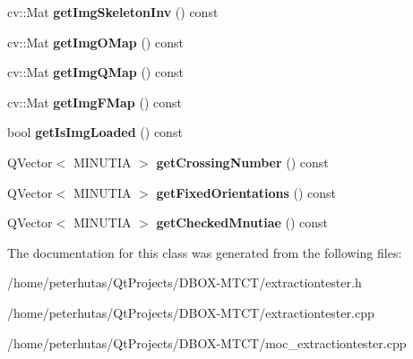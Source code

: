 \begin{DoxyCompactItemize}
\item 
\mbox{\label{class_extraction_tester_af64be134cee0ea0f58ce88e625156b23}} 
cv\+::\+Mat {\bfseries get\+Img\+Skeleton\+Inv} () const
\item 
\mbox{\label{class_extraction_tester_ab55ec8a210398568ff0f3cbe68d861ce}} 
cv\+::\+Mat {\bfseries get\+Img\+O\+Map} () const
\item 
\mbox{\label{class_extraction_tester_a1df8b0906aba9fa37c91bef924efa0f1}} 
cv\+::\+Mat {\bfseries get\+Img\+Q\+Map} () const
\item 
\mbox{\label{class_extraction_tester_a246569d4b1cc50c3b7f0557196674e65}} 
cv\+::\+Mat {\bfseries get\+Img\+F\+Map} () const
\item 
\mbox{\label{class_extraction_tester_a10ca92bb573fdeb262e75393806301fc}} 
bool {\bfseries get\+Is\+Img\+Loaded} () const
\item 
\mbox{\label{class_extraction_tester_aa250b93d32c1cd6eb6ff277b78bb4fd6}} 
Q\+Vector$<$ M\+I\+N\+U\+T\+IA $>$ {\bfseries get\+Crossing\+Number} () const
\item 
\mbox{\label{class_extraction_tester_a78add98013d8dc6bcd4e0564d63ae185}} 
Q\+Vector$<$ M\+I\+N\+U\+T\+IA $>$ {\bfseries get\+Fixed\+Orientations} () const
\item 
\mbox{\label{class_extraction_tester_a769c088dfe92a7f7fdb977ee521c86bb}} 
Q\+Vector$<$ M\+I\+N\+U\+T\+IA $>$ {\bfseries get\+Checked\+Mnutiae} () const
\end{DoxyCompactItemize}


The documentation for this class was generated from the following files\+:\begin{DoxyCompactItemize}
\item 
/home/peterhutas/\+Qt\+Projects/\+D\+B\+O\+X-\/\+M\+T\+C\+T/extractiontester.\+h\item 
/home/peterhutas/\+Qt\+Projects/\+D\+B\+O\+X-\/\+M\+T\+C\+T/extractiontester.\+cpp\item 
/home/peterhutas/\+Qt\+Projects/\+D\+B\+O\+X-\/\+M\+T\+C\+T/moc\+\_\+extractiontester.\+cpp\end{DoxyCompactItemize}
